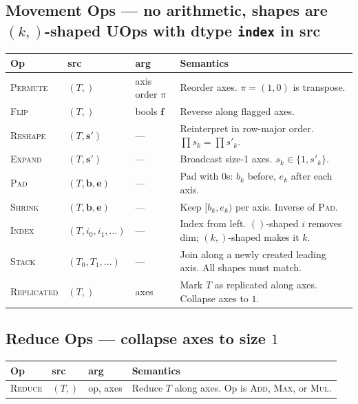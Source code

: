 \documentclass[10pt,letterpaper]{article}
\newcommand{\op}[1]{\textsc{#1}}
\begin{document}
\subsection*{{\color{movgreen}Movement Ops} \normalfont\small--- no arithmetic, shapes are $(k,)$-shaped UOps with dtype \texttt{index} in src}

\begin{tabular}{@{}l l l l@{}}
\toprule
\textbf{Op} & \textbf{src} & \textbf{arg} & \textbf{Semantics} \\
\midrule
\op{Permute} & $(T,)$ & axis order $\pi$ & Reorder axes. $\pi = (1,0)$ is transpose. \\
\op{Flip} & $(T,)$ & bools $\mathbf{f}$ & Reverse along flagged axes. \\
\op{Reshape} & $(T, \mathbf{s'})$ & --- & Reinterpret in row-major order. $\prod s_k = \prod s'_k$. \\
\op{Expand} & $(T, \mathbf{s'})$ & --- & Broadcast size-1 axes. $s_k \in \{1, s'_k\}$. \\
\op{Pad} & $(T, \mathbf{b}, \mathbf{e})$ & --- & Pad with $0$s: $b_k$ before, $e_k$ after each axis. \\
\op{Shrink} & $(T, \mathbf{b}, \mathbf{e})$ & --- & Keep $[b_k, e_k)$ per axis. Inverse of \op{Pad}. \\
\op{Index} & $(T, i_0, i_1, \ldots)$ & --- & Index from left. $()$-shaped $i$ removes dim; $(k,)$-shaped makes it $k$. \\
\op{Stack} & $(T_0, T_1, \ldots)$ & --- & Join along a newly created leading axis. All shapes must match. \\
\op{Replicated} & $(T,)$ & axes & Mark $T$ as replicated along axes. Collapse axes to $1$. \\
\bottomrule
\end{tabular}

\subsection*{{\color{reducered}Reduce Ops} \normalfont\small--- collapse axes to size $1$}

\begin{tabular}{@{}l l l l@{}}
\toprule
\textbf{Op} & \textbf{src} & \textbf{arg} & \textbf{Semantics} \\
\midrule
\op{Reduce} & $(T,)$ & op, axes & Reduce $T$ along axes. Op is \op{Add}, \op{Max}, or \op{Mul}. \\
\bottomrule
\end{tabular}
\end{document}
